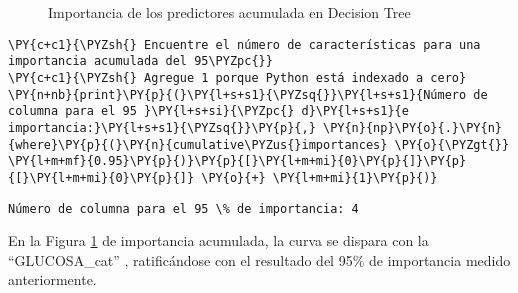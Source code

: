 \begin{center}
    	\begin{figure}[H]
	\centering
	\caption{Importancia de los predictores acumulada en Decision Tree}
	\label{fig:ipadt}
	\end{figure}
\end{center}
    
    \begin{tcolorbox}[breakable, size=fbox, boxrule=1pt, pad at break*=1mm,colback=cellbackground, colframe=cellborder]
\begin{Verbatim}[commandchars=\\\{\}]
\PY{c+c1}{\PYZsh{} Encuentre el número de características para una importancia acumulada del 95\PYZpc{}}
\PY{c+c1}{\PYZsh{} Agregue 1 porque Python está indexado a cero}
\PY{n+nb}{print}\PY{p}{(}\PY{l+s+s1}{\PYZsq{}}\PY{l+s+s1}{Número de columna para el 95 }\PY{l+s+si}{\PYZpc{} d}\PY{l+s+s1}{e importancia:}\PY{l+s+s1}{\PYZsq{}}\PY{p}{,} \PY{n}{np}\PY{o}{.}\PY{n}{where}\PY{p}{(}\PY{n}{cumulative\PYZus{}importances} \PY{o}{\PYZgt{}} \PY{l+m+mf}{0.95}\PY{p}{)}\PY{p}{[}\PY{l+m+mi}{0}\PY{p}{]}\PY{p}{[}\PY{l+m+mi}{0}\PY{p}{]} \PY{o}{+} \PY{l+m+mi}{1}\PY{p}{)}
\end{Verbatim}
\end{tcolorbox}

    \begin{Verbatim}[commandchars=\\\{\}]
Número de columna para el 95 \% de importancia: 4
    \end{Verbatim}

    En la Figura \ref{fig:ipadt} de importancia acumulada, la curva se dispara con la ``GLUCOSA\_cat'' , ratificándose con el resultado del 95\% de importancia medido anteriormente.\\
